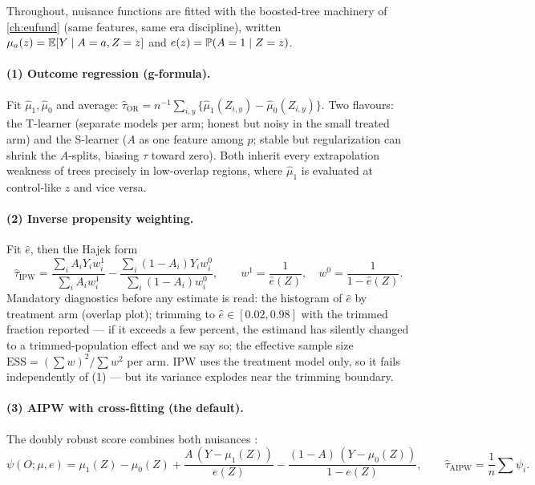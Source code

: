 Throughout, nuisance functions are fitted with the boosted-tree machinery of \cref{ch:eufund}
(same features, same era discipline), written $\mu_a(z) = \mathbb{E}[Y \mid A = a, Z = z]$ and $e(z) =
\mathbb{P}(A = 1 \mid Z = z)$.

\paragraph{(1) Outcome regression (g-formula).} Fit $\hat\mu_1, \hat\mu_0$ and average:
$\hat\tau_{\mathrm{OR}} = n^{-1} \sum_{i,y} \{\hat\mu_1(Z_{i,y}) - \hat\mu_0(Z_{i,y})\}$. Two
flavours: the T-learner (separate models per arm; honest but noisy in the small treated arm) and
the S-learner ($A$ as one feature among $p$; stable but regularization can shrink the
$A$-splits, biasing $\hat\tau$ toward zero). Both inherit every extrapolation weakness of trees
precisely in low-overlap regions, where $\hat\mu_{1}$ is evaluated at control-like $z$ and vice
versa.

\paragraph{(2) Inverse propensity weighting.} Fit $\hat e$, then the Hajek form
\[
\hat\tau_{\mathrm{IPW}} = \frac{\sum_i A_i Y_i w_i^1}{\sum_i A_i w_i^1} - \frac{\sum_i (1-A_i)
Y_i w_i^0}{\sum_i (1-A_i) w_i^0}, \qquad w^1 = \frac{1}{\hat e(Z)}, \quad w^0 = \frac{1}{1 -
\hat e(Z)}.
\]
Mandatory diagnostics before any estimate is read: the histogram of $\hat e$ by treatment arm
(overlap plot); trimming to $\hat e \in [0.02, 0.98]$ with the trimmed fraction reported --- if
it exceeds a few percent, the estimand has silently changed to a trimmed-population effect and
we say so; the effective sample size $\mathrm{ESS} = (\sum w)^2 / \sum w^2$ per arm. IPW uses
the treatment model only, so it fails independently of (1) --- but its variance explodes near
the trimming boundary.

\paragraph{(3) AIPW with cross-fitting (the default).} The doubly robust score combines both
nuisances \citep{chernozhukov2018}:
\begin{equation}\label{eq:causal-aipw}
\psi(O; \mu, e) = \mu_1(Z) - \mu_0(Z)
+ \frac{A\,(Y - \mu_1(Z))}{e(Z)}
- \frac{(1-A)\,(Y - \mu_0(Z))}{1 - e(Z)},
\qquad
\hat\tau_{\mathrm{AIPW}} = \frac{1}{n} \sum \psi_i .
\end{equation}

